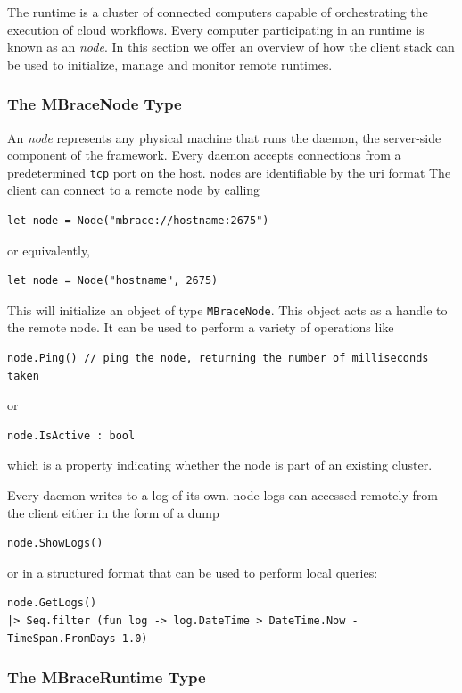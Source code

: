 The \mbrace{} runtime is a cluster of connected computers capable of orchestrating the execution
of cloud workflows. Every computer participating in an \mbrace{} runtime is known as an \mbrace{}
\emph{node}. In this section we offer an overview of how the \mbrace{} client stack can be
used to initialize, manage and monitor remote \mbrace{} runtimes.

\subsubsection*{The MBraceNode Type}

An \mbrace{} \emph{node} represents any physical machine that runs the \emph{\mbrace{}} daemon, 
the server-side component of the framework. Every \mbrace{} daemon accepts connections from a predetermined 
\texttt{tcp} port on the host. \Mbrace{} nodes are identifiable by the uri format
The \mbrace{} client can connect to a remote node by calling
\begin{lstlisting}
let node = Node("mbrace://hostname:2675")
\end{lstlisting}
or equivalently,
\begin{lstlisting}
let node = Node("hostname", 2675)
\end{lstlisting}
This will initialize an object of type \texttt{MBraceNode}. This object acts as a handle
to the remote node. It can be used to perform a variety of operations like
\begin{lstlisting}
node.Ping() // ping the node, returning the number of milliseconds taken
\end{lstlisting}
or
\begin{lstlisting}
node.IsActive : bool
\end{lstlisting}
which is a property indicating whether the node is part of an existing \mbrace{} cluster.

Every \mbrace{} daemon writes to a log of its own. \Mbrace{} node logs can accessed remotely
from the client either in the form of a dump
\begin{lstlisting}
node.ShowLogs()
\end{lstlisting}
or in a structured format that can be used to perform local queries:
\begin{lstlisting}
node.GetLogs() 
|> Seq.filter (fun log -> log.DateTime > DateTime.Now - TimeSpan.FromDays 1.0)
\end{lstlisting}

\subsubsection*{The MBraceRuntime Type}

